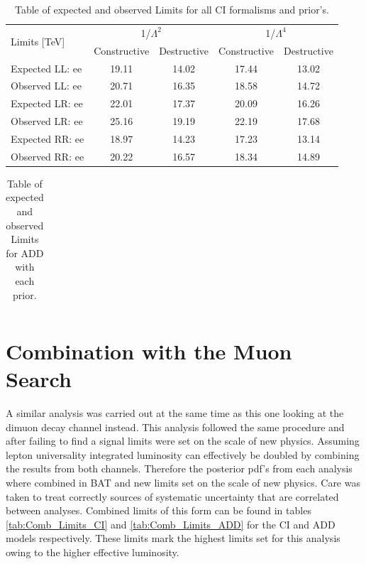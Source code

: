     \begin {table}[h]
        \begin{center}
        \begin{tabular}{ | l | c | c | c | c | } 
            \hline
            \multirow{2}{*}{Limits [TeV]} & \multicolumn{2}{c|}{1/$\Lambda^2$} & \multicolumn{2}{c|}{1/$\Lambda^4$} \\
\cline{2-5}
 & Constructive & Destructive & Constructive & Destructive \\
\hline
Expected LL: ee       & 19.11 & 14.02 & 17.44 & 13.02 \\
Observed LL: ee       & 20.71 & 16.35 & 18.58 & 14.72 \\
Expected LR: ee       & 22.01 & 17.37 & 20.09 & 16.26 \\
Observed LR: ee       & 25.16 & 19.19 & 22.19 & 17.68 \\
Expected RR: ee       & 18.97 & 14.23 & 17.23 & 13.14 \\
Observed RR: ee       & 20.22 & 16.57 & 18.34 & 14.89 \\
            \hline
        \end{tabular}
        \caption{Table of expected and observed Limits for all CI formalisms and prior's.}
        \label{tab:limits_CI}
        \end{center}
    \end {table}


    \begin {table}[h]
        \begin{center}
        \begin{tabular}{ | l | c | c | c | } 
            \hline
            
            \hline
        \end{tabular}
        \caption{Table of expected and observed Limits for ADD with each prior.}
        \label{tab:limits_ADD}
        \end{center}
    \end {table}





\section{Combination with the Muon Search}

    A similar analysis was carried out at the same time as this one looking at the dimuon decay channel instead. This analysis followed the same procedure and after failing to find a signal limits were set on the scale of new physics. Assuming lepton universality integrated luminosity can effectively be doubled by combining the results from both channels. Therefore the posterior pdf's from each analysis where combined in BAT and new limits set on the scale of new physics. Care was taken to treat correctly sources of systematic uncertainty that are correlated between analyses. Combined limits of this form can be found in tables \ref{tab:Comb_Limits_CI} and \ref{tab:Comb_Limits_ADD} for the CI and ADD models respectively. These limits mark the highest limits set for this analysis owing to the higher effective luminosity. 


